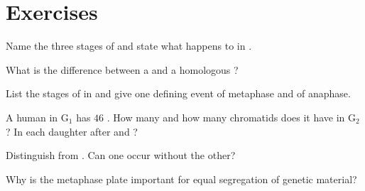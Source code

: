 \section{Exercises}

\begin{exercise}[$\star$]\label{exo:g11:cell-cycle-mitosis:1}
Name the three stages of  and state what happens to  in .
\end{exercise}

\begin{exercise}[$\star$]\label{exo:g11:cell-cycle-mitosis:2}
What is the difference between a  and a homologous ?
\end{exercise}

\begin{exercise}[$\star$]\label{exo:g11:cell-cycle-mitosis:3}
List the stages of  in  and give one defining event of metaphase
and of anaphase.
\end{exercise}

\begin{exercise}[$\star\star$]\label{exo:g11:cell-cycle-mitosis:4}
A human  in G$_1$ has $46$ . How many  and how many
chromatids does it have in G$_2$? In each daughter  after  and
?
\end{exercise}

\begin{exercise}[$\star\star$]\label{exo:g11:cell-cycle-mitosis:5}
Distinguish  from . Can one occur without the other?
\end{exercise}

\begin{exercise}[$\star\star$]\label{exo:g11:cell-cycle-mitosis:6}
Why is the metaphase plate important for equal segregation of genetic material?
\end{exercise}

